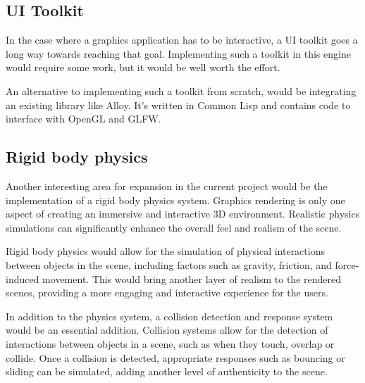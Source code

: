 \subsection{UI Toolkit}

In the case where a graphics application has to be interactive,
a UI toolkit goes a long way towards reaching that goal.
Implementing such a toolkit in this engine would require some work,
but it would be well worth the effort.

An alternative to implementing such a toolkit from scratch,
would be integrating an existing library like Alloy.
It's written in Common Lisp and contains code to interface with OpenGL and GLFW\cite{alloy}.



\subsection{Rigid body physics}

Another interesting area for expansion in the current project would be the implementation of a rigid body physics system.
Graphics rendering is only one aspect of creating an immersive and interactive 3D environment.
Realistic physics simulations can significantly enhance the overall feel and realism of the scene.

Rigid body physics would allow for the simulation of physical interactions between objects in the scene,
including factors such as gravity,
friction,
and force-induced movement.
This would bring another layer of realism to the rendered scenes,
providing a more engaging and interactive experience for the users.

In addition to the physics system,
a collision detection and response system would be an essential addition.
Collision systems allow for the detection of interactions between objects in a scene,
such as when they touch,
overlap or collide.
Once a collision is detected,
appropriate responses such as bouncing or sliding can be simulated,
adding another level of authenticity to the scene.

